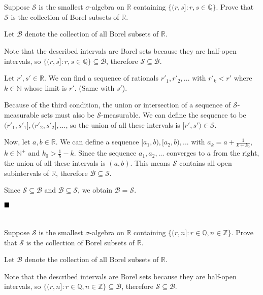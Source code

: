 \documentclass[11pt, a4paper, tikz]{article}
\newcommand{\centsection}[1]{
	\section*{\centering{#1}}
}
\renewcommand{\qed}{\hfill\blacksquare}
\newcommand{\naturals}{
	\ensuremath{\mathbb{N}}
}
\newcommand{\integers}{
	\ensuremath{\mathbb{Z}}
}
\newcommand{\rationals}{
	\ensuremath{\mathbb{Q}}
}
\newcommand{\reals}{
	\ensuremath{\mathbb{R}}
}
\newcommand{\sigmaAlgebra}[1]{
	\ensuremath{\mathcal{#1}}
}
\begin{document}
	\centsection{Exercise 3}
	
	\begin{formulationBox}
		Suppose $\sigmaAlgebra{S}$ is the smallest $\sigma$-algebra on $\reals$ containing $\{(r,s]:r,s\in\rationals\}$. Prove that $\sigmaAlgebra{S}$ is the collection of Borel subsets of $\reals$.
	\end{formulationBox}

	Let $\sigmaAlgebra{B}$ denote the collection of all Borel subsets of $\reals$.

	Note that the described intervals are Borel sets because they are half-open intervals, so $\{(r,s]:r,s\in\rationals\}\subseteq\sigmaAlgebra{B}$, therefore $\sigmaAlgebra{S}\subseteq\sigmaAlgebra{B}$.
	
	Let $r',s'\in\reals$. We can find a sequence of rationals $r'_1, r'_2, ...$ with $r'_k < r'$ where $k\in\naturals$ whose limit is $r'$. (Same with $s'$).
	
	Because of the third condition, the union or intersection of a sequence of $\sigmaAlgebra{S}$-measurable sets must also be $\sigmaAlgebra{S}$-measurable. We can define the sequence to be $(r'_1, s'_1], (r'_2,s'_2], ...$, so the union of all these intervals is $[r', s')\in\sigmaAlgebra{S}$.
	
	Now, let $a,b\in\reals$. We can define a sequence $[a_1, b), [a_2, b), ...$ with $a_k = a+\frac{1}{k+k_0}$, $k\in\naturals^+$ and $k_0>\frac{1}{b}-k$. Since the sequence $a_1, a_2, ...$ converges to $a$ from the right, the union of all these intervals is $(a, b)$. This means $\sigmaAlgebra{S}$ contains all open subintervals of $\reals$, therefore $\sigmaAlgebra{B} \subseteq \sigmaAlgebra{S}$.
	
	Since $\sigmaAlgebra{S}\subseteq\sigmaAlgebra{B}$ and $\sigmaAlgebra{B} \subseteq \sigmaAlgebra{S}$, we obtain $\sigmaAlgebra{B} = \sigmaAlgebra{S}$.
	
	$\qed$
	
	\centsection{Exercise 4}
	
	\begin{formulationBox}
		Suppose $\sigmaAlgebra{S}$ is the smallest $\sigma$-algebra on $\reals$ containing $\{(r,n]:r\in\rationals,n\in\integers\}$. Prove that $\sigmaAlgebra{S}$ is the collection of Borel subsets of $\reals$.
	\end{formulationBox}
	
	Let $\sigmaAlgebra{B}$ denote the collection of all Borel subsets of $\reals$.
	
	Note that the described intervals are Borel sets because they are half-open intervals, so $\{(r,n]:r\in\rationals,n\in\integers\}\subseteq\sigmaAlgebra{B}$, therefore $\sigmaAlgebra{S}\subseteq\sigmaAlgebra{B}$.
	
\end{document}
